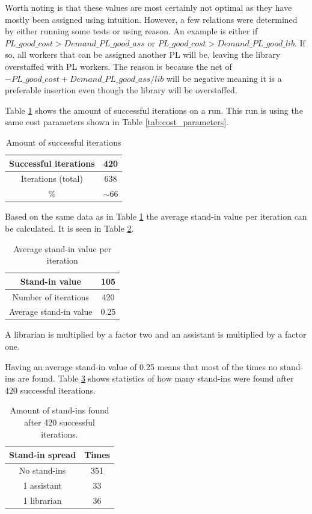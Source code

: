 Worth noting is that these values are most certainly not optimal as they have mostly been assigned using intuition. However, a few relations were determined by either running some tests or using reason. An example is either if $PL\_good\_cost > Demand\_PL\_good\_ass$ or $PL\_good\_cost > Demand\_PL\_good\_lib$. If so, all workers that can be assigned another PL will be, leaving the library overstaffed with PL workers. The reason is because the net of $-PL\_good\_cost + Demand\_PL\_good\_ass/lib$ will be negative meaning it is a preferable insertion even though the library will be overstaffed.

Table \ref{successful_iter} shows the amount of successful iterations on a run. This run is using the same cost parameters shown in Table \ref{tab:cost_parameters}. 
\begin{table}[!h]
\centering
\caption{Amount of successful iterations}
\label{successful_iter}
\begin{tabular}{|c|c|}
\hline
Successful iterations         & 420      \\ \hline
Iterations (total) & 638      \\ \hline
\%                 & $\sim$66 \\ \hline
\end{tabular}
\end{table}

Based on the same data as in Table \ref{successful_iter} the average stand-in value per iteration can be calculated. It is seen in Table \ref{tab:average_stand_ins}.
\begin{table}[!h]
\centering
\caption{Average stand-in value per iteration}
\label{tab:average_stand_ins}
\begin{tabular}{|c|c|}
\hline
Stand-in value & 105      \\ \hline
Number of iterations         & 420      \\ \hline
Average stand-in value      & 0.25 \\ \hline
\end{tabular}
\end{table}
A librarian is multiplied by a factor two and an assistant is multiplied by a factor one.

Having an average stand-in value of 0.25 means that most of the times no stand-ins are found. Table \ref{tab:stand_in_spread} shows statistics of how many stand-ins were found after 420 successful iterations. 
\begin{table}[!h]
\centering
\caption{Amount of stand-ins found after 420 successful iterations.}
\label{tab:stand_in_spread}
\begin{tabular}{|c|c|}
\hline
\rowcolor[HTML]{D2D2D2} 
Stand-in spread & Times \\ \hline
No stand-ins    & 351                      \\ \hline
1 assistant     & 33                      \\ \hline
1 librarian 	& 36 \\ \hline
\end{tabular}
\end{table}

